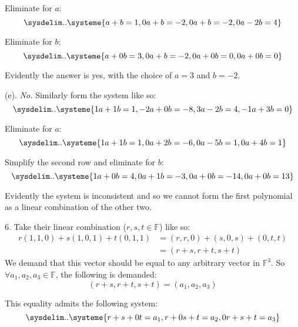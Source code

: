 \documentclass[11pt]{article}
\newcommand{\br}[1]{\left(#1\right)}
\begin{document}
Eliminate for $a$:
\begin{equation*}
    \sysdelim..\systeme{
        a  +b =  1,
        0a  +b =  -2,
        0a  +b =  -2,
        0a  -2b =  4
    }
\end{equation*}

Eliminate for $b$:
\begin{equation*}
    \sysdelim..\systeme{
        a  +0b =  3,
        0a  +b =  -2,
        0a  +0b =  0,
        0a  +0b =  0        
    }
\end{equation*}

Evidently the answer is yes, with the choice of $a=3$ and $b=-2$.

(e). \textit{No.} Similarly form the system like so:
\begin{equation*}
    \sysdelim..\systeme{
        1a +1b =  1,
        -2a +0b =  -8,
        3a  -2b =  4,
        -1a +3b =  0
    }
\end{equation*}

Eliminate for $a$:
\begin{equation*}
    \sysdelim..\systeme{
        1a +1b =  1,
        0a +2b =  -6,
        0a  -5b =  1,
        0a +4b =  1
    }
\end{equation*}

Simplify the second row and eliminate for $b$:
\begin{equation*}
    \sysdelim..\systeme{
        1a +0b =  4,
        0a +1b =  -3,
        0a  +0b =  -14,
        0a +0b =  13 
    }
\end{equation*}

Evidently the system is inconsistent and so we cannot form the first polynomial as a linear combination of the other two.

6. Take their linear combination ($r,s,t\in\mathbb{F}$) like so:
\begin{align*}
    r\br{1,1,0} + s\br{1,0,1} + t\br{0,1,1} &= \br{r, r, 0} + \br{s, 0, s} + \br{0, t, t} \\
    &=  \br{r + s, r + t, s + t}  
\end{align*}
We demand that this vector should be equal to any arbitrary vector in $\mathbb{F}^3$. So $\forall a_1,a_2,a_3\in\mathbb{F}$, the following is demanded:
$$\br{r + s, r + t, s + t} = \br{a_1,a_2,a_3}$$

This equality admits the following system:
\begin{equation*}
    \sysdelim..\systeme{
        r +s +0t = a_1,
        r +0s +t = a_2,
        0r +s +t = a_3
    }
\end{equation*}
\end{document}
